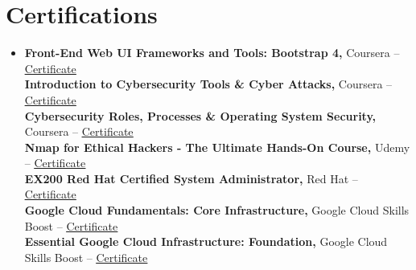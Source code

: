 \documentclass[letterpaper,16pt]{article}
\newcommand{\resumeSubHeadingListStart}{\begin{itemize}[leftmargin=0.15in, label={}]}
\newcommand{\resumeSubHeadingListEnd}{\end{itemize}}
\begin{document}
\section{Certifications}
 \resumeSubHeadingListStart
   \item{
     \textbf{Front-End Web UI Frameworks and Tools: Bootstrap 4, }{Coursera -- \href{https://coursera.org/share/6f277b468374e3dbe6a26c67811db539}{\color{Aquamarine}\underline{Certificate}}}
     \hfill \\
     \textbf{Introduction to Cybersecurity Tools \& Cyber Attacks, }{Coursera -- \href{https://coursera.org/share/317c6874e71c67cfde693de6e5de7e49}{\color{Aquamarine}\underline{Certificate}}}
     \hfill \\
     \textbf{Cybersecurity Roles, Processes \& Operating System Security, }{Coursera -- \href{https://coursera.org/share/2ab125b6a50b05a2ed5eb454cce95afd}{\color{Aquamarine}\underline{Certificate}}}
     \hfill \\
     \textbf{Nmap for Ethical Hackers - The Ultimate Hands-On Course, }{Udemy -- 
     \href{https://www.udemy.com/certificate/UC-bd741301-70d9-4a30-a11e-26f92aa1c287/}{\color{Aquamarine}\underline{Certificate}}}
     \hfill \\
     \textbf{EX200 Red Hat Certified System Administrator, }{Red Hat -- \href{https://rhtapps.redhat.com/verify?certId=230-264-087}{\color{Aquamarine}\underline{Certificate}}}
     \hfill \\
     \textbf{Google Cloud Fundamentals: Core Infrastructure, }{Google Cloud Skills Boost -- \href{https://www.cloudskillsboost.google/public_profiles/bd9c5896-4d7c-44d8-aa79-295b8944bf04/badges/4323872}{\color{Aquamarine}\underline{Certificate}}}
     \hfill \\
     \textbf{Essential Google Cloud Infrastructure: Foundation, }{Google Cloud Skills Boost -- \href{https://www.cloudskillsboost.google/public_profiles/bd9c5896-4d7c-44d8-aa79-295b8944bf04/badges/4760001?utm_medium=social&utm_source=linkedin&utm_campaign=ql-social-share}{\color{Aquamarine}\underline{Certificate}}}
   }
 \resumeSubHeadingListEnd
\end{document}
